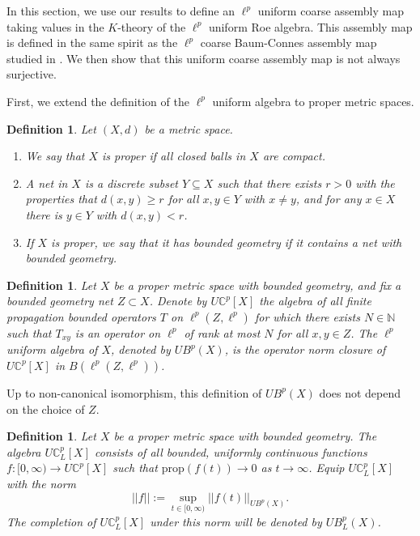 \documentclass[a4,11pt]{amsart}
\newtheorem{defn}[thm]{Definition}
\theoremstyle{remark}
\begin{document}
In this section, we use our results to define an $\ell^p$ uniform coarse assembly map taking values in the $K$-theory of the $\ell^p$ uniform Roe algebra.
This assembly map is defined in the same spirit as the $\ell^p$ coarse Baum-Connes assembly map studied in \cite{Chung23,SW,ZZ}.
We then show that this uniform coarse assembly map is not always surjective.

First, we extend the definition of the $\ell^p$ uniform algebra to proper metric spaces.

\begin{defn}
Let $(X,d)$ be a metric space. 
\begin{enumerate}
\item We say that $X$ is proper if all closed balls in $X$ are compact.
\item A net in $X$ is a discrete subset $Y\subseteq X$ such that there exists $r>0$ with the properties that $d(x,y)\geq r$ for all $x,y\in Y$ with $x\neq y$, and for any $x\in X$ there is $y\in Y$ with $d(x,y)<r$.
\item If $X$ is proper, we say that it has bounded geometry if it contains a net with bounded geometry.
\end{enumerate}
\end{defn}

\begin{defn}
Let $X$ be a proper metric space with bounded geometry, and fix a bounded geometry net $Z\subset X$. 
Denote by $U\mathbb{C}^p[X]$ the algebra of all finite propagation bounded operators $T$ on $\ell^p(Z,\ell^p)$ for which there exists $N\in\mathbb{N}$ such that 
$T_{xy}$ is an operator on $\ell^p$ of rank at most $N$ for all $x,y\in Z$.
The $\ell^p$ uniform algebra of $X$, denoted by $UB^p(X)$, is the operator norm closure of $U\mathbb{C}^p[X]$ in $B(\ell^p(Z,\ell^p))$.
\end{defn}

Up to non-canonical isomorphism, this definition of $UB^p(X)$ does not depend on the choice of $Z$.

\begin{defn} 
Let $X$ be a proper metric space with bounded geometry. The algebra $U\mathbb{C}^p_L[X]$ consists of all bounded, uniformly continuous functions $f:[0,\infty)\rightarrow U\mathbb{C}^p[X]$ such that $\mathrm{prop}(f(t))\rightarrow 0$ as $t\rightarrow\infty$. Equip $U\mathbb{C}^p_L[X]$ with the norm
\[ ||f||:=\sup_{t\in[0,\infty)}||f(t)||_{UB^p(X)}. \]
The completion of $U\mathbb{C}^p_L[X]$ under this norm will be denoted by $UB^p_L(X)$.
\end{defn}
\end{document}
